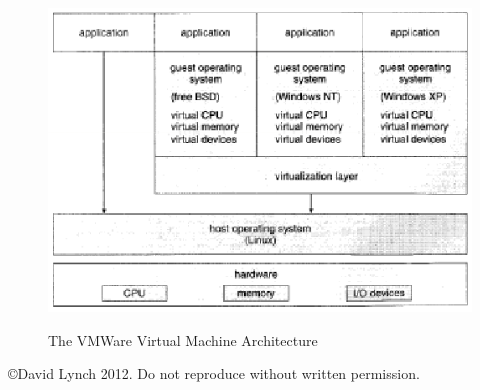 \documentclass[10pt,a4paper]{article}
\begin{document}
\begin{figure}
\caption{The VMWare Virtual Machine Architecture \cite{OSCONCEPTS}}
\begin{center}
\includegraphics[scale=0.45]{../images/vm-arch.png}
\label{vmarch}
\end{center}
\end{figure}
{}

\begin{center}
{\small \copyright  David Lynch 2012. Do not reproduce without written permission.}
\end{center}
\end{document}
